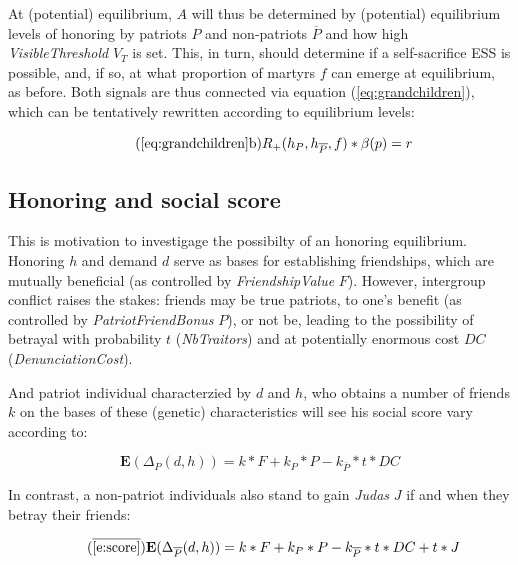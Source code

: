 \documentclass[a4paper,12pt]{report}
\begin{document}
At (potential) equilibrium, $A$ will thus be determined by (potential) equilibrium levels
of honoring by patriots $P$ and non-patriots $\overline{P}$ and how high 
\emph{VisibleThreshold} $V_T$ is set. This, in turn, should determine
 if a self-sacrifice ESS is possible,
and, if so, at what proportion of martyrs $f$ can emerge at equilibrium, as before. Both
signals are thus connected via equation (\ref{eq:grandchildren}), which
can be tentatively rewritten according to equilibrium levels:

\begin{equation}
    \tag{\ref{eq:grandchildren}b}
    R_+(h_{P},h_{\overline{P}},f)*\beta(p) = r
\end{equation}

\subsection{Honoring and social score}

This is motivation to investigage the possibilty of an honoring equilibrium. Honoring $h$
and demand $d$ serve as bases for establishing friendships, which are mutually beneficial
(as controlled by \emph{FriendshipValue} $F$). However, intergroup conflict raises the stakes:
friends may be true patriots, to one's benefit (as controlled by \emph{PatriotFriendBonus} $P$),
or not be, leading to the possibility of betrayal with probability $t$ (\emph{NbTraitors})
and at potentially enormous cost $DC$ (\emph{DenunciationCost}).

And patriot individual characterzied by $d$ and $h$, who obtains a number of friends $k$ on the
bases of these (genetic) characteristics will see his social score vary according to:

\begin{equation}
    \label{e:score}
    \mathbf{E}(\Delta_P(d,h)) = k*F + k_{P}*P - k_{\overline{P}}*t*DC
\end{equation}

In contrast, a non-patriot individuals also stand to gain \emph{Judas} $J$ if and when they
betray their friends:

\begin{equation}
    \tag{$\overline{\ref{e:score}}$}
    \label{e:score_NP}
    \mathbf{E}(\Delta_{\overline{P}}(d,h)) = k*F + k_{P}*P - k_{\overline{P}}*t*DC + t*J
\end{equation}
\end{document}
